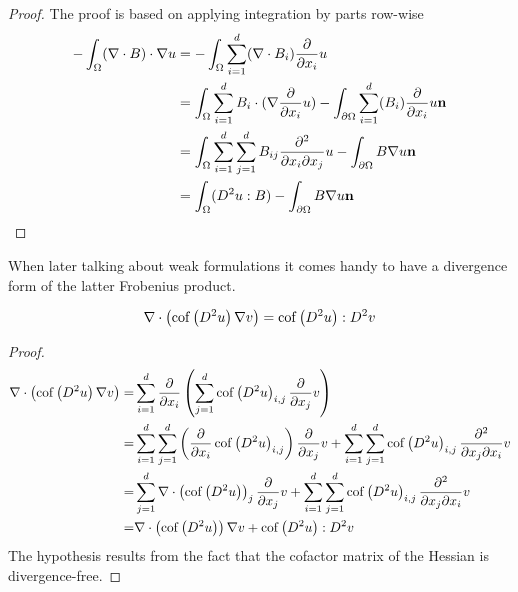 \begin{proof}
The proof is based on applying integration by parts row-wise
\begin{align*}
- \int_\Omega (\nabla \cdot B) \cdot \nabla u &= 
- \int_\Omega \sum_{i = 1}^{d} (\nabla \cdot B_i) \frac \partial {\partial x_i} u \\
&=  \int_\Omega \sum_{i = 1}^{d} B_i \cdot  (\nabla \frac \partial {\partial x_i} u) - \int_{\partial \Omega} \sum_{i = 1}^{d} (B_i) \frac \partial {\partial x_i} u \mathbf{n} \\
&=  \int_\Omega \sum_{i = 1}^{d}\sum_{j= 1}^{d} B_{ij} \frac {\partial^2} {\partial x_i\partial x_j} u- \int_{\partial \Omega} B \nabla u \mathbf{n} \\
&=  \int_\Omega (D^2 u : B)- \int_{\partial \Omega} B \nabla u \mathbf{n} 
\end{align*}
\end{proof}

When later talking about weak formulations it comes handy to have a divergence form of the latter Frobenius product.
\begin{lemma} \label{la: An application of the divergernce product rule}
\[
		\nabla \cdot \left( \mycof {D^2 u } \nabla v \right) %
		= \mycof {D^2 u}: D^2 v
\] 
\end{lemma}

\begin{proof}
\begin{align*}
\nabla \cdot \left( \mycof {D^2 u } \nabla v \right) =&%
\sum_{i= 1}^{d} \dx {x_i} 	\left( \sum_{j= 1}^{d} \mycof {D^2 u }_{i,j} \dx{x_j} v \right)\\
=&  \sum_{i= 1}^{d} \sum_{j= 1}^{d}  \left(\dx {x_i} \mycof {D^2 u }_{i,j}  \right) \dx{x_j}v + \sum_{i= 1}^{d} \sum_{j= 1}^{d}  \mycof {D^2 u }_{i,j} \dxy{x_j}{x_i}v\\
=&  \sum_{j= 1}^{d}  \nabla \cdot \left(\mycof {D^2 u }\right)_j \dx{x_j}v + \sum_{i= 1}^{d} \sum_{j= 1}^{d}  \mycof {D^2 u }_{i,j} \dxy{x_j}{x_i}v\\
=&   \nabla \cdot \left(\mycof {D^2 u }\right) \nabla v+ \mycof {D^2 u }:D^2v
\end{align*}
The hypothesis results from the fact that the cofactor matrix of the Hessian is divergence-free.
\end{proof}
